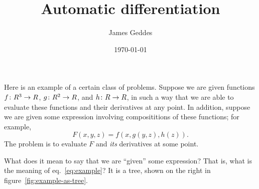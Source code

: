 \documentclass[11pt, a4paper]{article}
\title{Automatic differentiation}
\author{James Geddes}
\date{\today}
\newcommand{\set}[1]{\boldmath{#1}}
\newcommand{\setR}{\set{R}}
\begin{document}
\maketitle

Here is an example of a certain class of problems. Suppose we are
given functions $f\colon \setR^3 \to \setR$,
$g\colon \setR^2\to\setR$, and $h\colon \setR\to\setR$, in such a way that
we are able to evaluate these functions and their derivatives at any
point. In addition, suppose we are given some expression involving
composititions of these functions; for example,
\begin{equation}
  F(x, y, z) = f(x, g(y, z), h(z)).
\label{eq:example}\end{equation}
The problem is to evaluate $F$ and \emph{its} derivatives at some
point.

What does it mean to say that we are ``given'' some expression? That
is, what is the meaning of eq.~\eqref{eq:example}? It is a tree, shown
on the right in figure~\ref{fig:example-as-tree}.
\begin{marginfigure}

\end{marginfigure}
\end{document}
